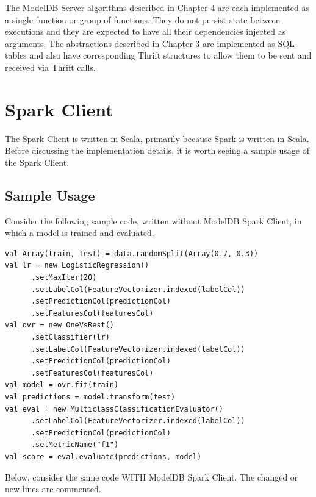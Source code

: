 The ModelDB Server algorithms described in Chapter 4 are each implemented as a single function
or group of functions. They do not persist state between executions and they are expected to have all
their dependencies injected as arguments. The abstractions described in Chapter 3 are implemented as 
SQL tables and also have corresponding Thrift structures to allow them to be sent and received via Thrift
calls.

\section{Spark Client}
The Spark Client is written in Scala, primarily because Spark is written in Scala.
Before discussing the implementation details, it is worth seeing a sample usage
of the Spark Client.

\subsection{Sample Usage}
Consider the following sample code, written without ModelDB Spark Client, 
in which a model is trained and evaluated.

\begin{verbatim}
val Array(train, test) = data.randomSplit(Array(0.7, 0.3))
val lr = new LogisticRegression()
      .setMaxIter(20)
      .setLabelCol(FeatureVectorizer.indexed(labelCol))
      .setPredictionCol(predictionCol)
      .setFeaturesCol(featuresCol)
val ovr = new OneVsRest()
      .setClassifier(lr)
      .setLabelCol(FeatureVectorizer.indexed(labelCol))
      .setPredictionCol(predictionCol)
      .setFeaturesCol(featuresCol)
val model = ovr.fit(train)
val predictions = model.transform(test)
val eval = new MulticlassClassificationEvaluator()
      .setLabelCol(FeatureVectorizer.indexed(labelCol))
      .setPredictionCol(predictionCol)
      .setMetricName("f1")
val score = eval.evaluate(predictions, model)
\end{verbatim}

Below, consider the same code WITH ModelDB Spark Client. The changed or
new lines are commented.

